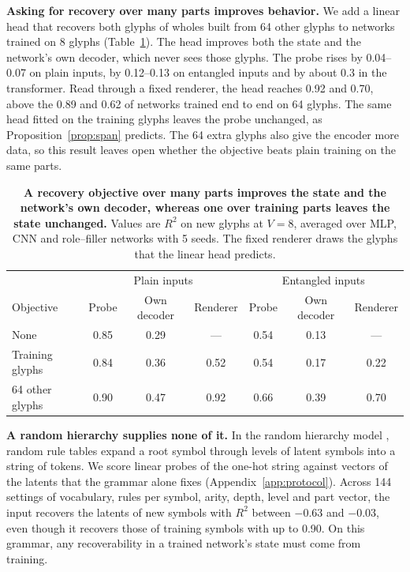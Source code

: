 \textbf{Asking for recovery over many parts improves behavior.} We add a linear head that recovers both glyphs of wholes built from 64 other glyphs to networks trained on 8 glyphs (Table~\ref{tab:objective}). The head improves both the state and the network's own decoder, which never sees those glyphs. The probe rises by 0.04--0.07 on plain inputs, by 0.12--0.13 on entangled inputs and by about 0.3 in the transformer. Read through a fixed renderer, the head reaches 0.92 and 0.70, above the 0.89 and 0.62 of networks trained end to end on 64 glyphs. The same head fitted on the training glyphs leaves the probe unchanged, as Proposition~\ref{prop:span} predicts. The 64 extra glyphs also give the encoder more data, so this result leaves open whether the objective beats plain training on the same parts.

\begin{table}[h]
  \caption{\textbf{A recovery objective over many parts improves the state and the network's own decoder, whereas one over training parts leaves the state unchanged.} Values are $R^2$ on new glyphs at $V = 8$, averaged over MLP, CNN and role--filler networks with 5 seeds. The fixed renderer draws the glyphs that the linear head predicts.}
  \label{tab:objective}
  \centering\small
  \begin{tabular}{@{}lcccccc@{}}
    \toprule
    & \multicolumn{3}{c}{Plain inputs} & \multicolumn{3}{c}{Entangled inputs} \\
    Objective & Probe & Own decoder & Renderer & Probe & Own decoder & Renderer \\
    \midrule
    None & 0.85 & 0.29 & --- & 0.54 & 0.13 & --- \\
    Training glyphs & 0.84 & 0.36 & 0.52 & 0.54 & 0.17 & 0.22 \\
    64 other glyphs & 0.90 & 0.47 & 0.92 & 0.66 & 0.39 & 0.70 \\
    \bottomrule
  \end{tabular}
\end{table}

\textbf{A random hierarchy supplies none of it.} In the random hierarchy model \citep{cagnetta2024rhm}, random rule tables expand a root symbol through levels of latent symbols into a string of tokens. We score linear probes of the one-hot string against vectors of the latents that the grammar alone fixes (Appendix~\ref{app:protocol}). Across 144 settings of vocabulary, rules per symbol, arity, depth, level and part vector, the input recovers the latents of new symbols with $R^2$ between $-0.63$ and $-0.03$, even though it recovers those of training symbols with up to 0.90. On this grammar, any recoverability in a trained network's state must come from training.

